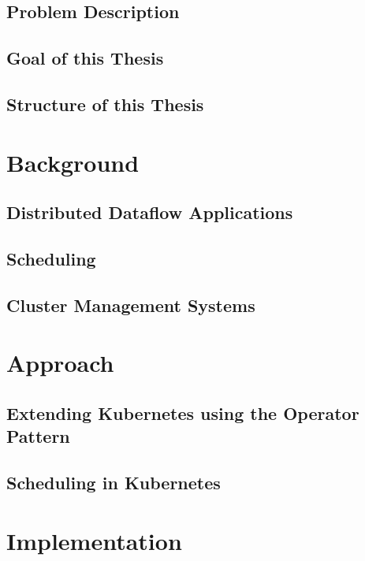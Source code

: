 \section{Problem Description}

\section{Goal of this Thesis}

\section{Structure of this Thesis}



\chapter{Background}
\section{Distributed Dataflow Applications}

\section{Scheduling}

\section{Cluster Management Systems}


\chapter{Approach}

\section{Extending Kubernetes using the Operator Pattern}

\section{Scheduling in Kubernetes}



\chapter{Implementation}
